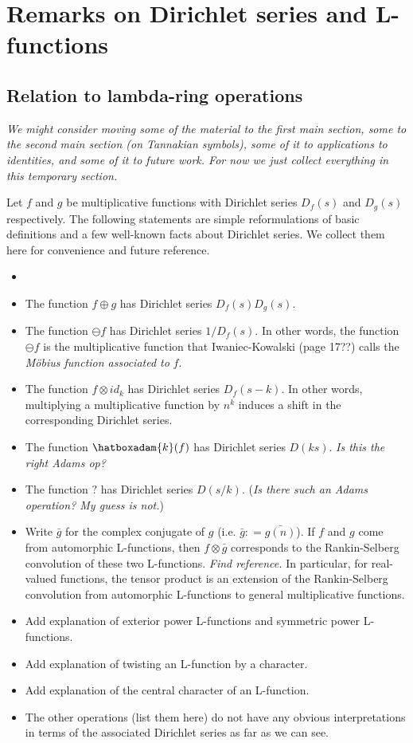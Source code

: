\documentclass[a4paper]{article}
\begin{document}
\section{Remarks on Dirichlet series and L-functions}

\subsection{Relation to lambda-ring operations}

\emph{We might consider moving some of the material to the first main section, some to the second main section (on Tannakian symbols), some of it to applications to identities, and some of it to future work. For now we just collect everything in this temporary section.}

Let $f$ and $g$ be multiplicative functions with Dirichlet series $D_f(s)$ and $D_g(s)$ respectively. The following statements are simple reformulations of basic definitions and a few well-known facts about Dirichlet series. We collect them here for convenience and future reference.
\begin{itemize}
\item {}
\item The function $f \oplus g$ has Dirichlet series $D_f(s) D_g(s)$.
\item The function $\ominus f$ has Dirichlet series $1/D_f(s)$. In other words, the function $\ominus f$ is the multiplicative function that Iwaniec-Kowalski (page 17??) calls the \emph{M{\"o}bius function associated to} $f$.
\item The function $f \otimes id_{k}$ has Dirichlet series $D_f(s-k)$. In other words, multiplying a multiplicative function by $n^k$ induces a shift in the corresponding Dirichlet series.
\item The function $\hatboxadam{k}(f)$ has Dirichlet series $D(ks)$. \emph{Is this the right Adams op?}
\item The function $?$ has Dirichlet series $D(s/k)$. (\emph{Is there such an Adams operation? My guess is not.})
\item Write $\bar{g}$ for the complex conjugate of $g$ (i.e. $\bar{g} : = \bar{g(n)} $). If $f$ and $g$ come from automorphic L-functions, then $f \otimes \bar{g}$ corresponds to the Rankin-Selberg convolution of these two L-functions. \emph{Find reference.} In particular, for real-valued functions, the tensor product is an extension of the Rankin-Selberg convolution from automorphic L-functions to general multiplicative functions.
\item Add explanation of exterior power L-functions and symmetric power L-functions.
\item Add explanation of twisting an L-function by a character.
\item Add explanation of the central character of an L-function.
\item The other operations (list them here) do not have any obvious interpretations in terms of the associated Dirichlet series as far as we can see.
\end{itemize}
\end{document}

